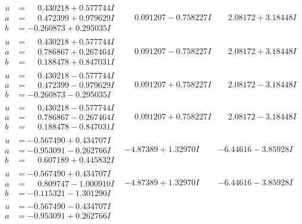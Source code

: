 \documentclass[1p]{elsarticle_modified}
\theoremstyle{definition}
\begin{document}
$$\begin{array}{c|c|c}
\begin{aligned}
u &= \phantom{-}0.430218 + 0.577744 I \\
a &= \phantom{-}0.472399 + 0.979629 I \\
b &= -0.260873 + 0.295035 I\end{aligned}
 & \phantom{-}0.091207 - 0.758227 I & \phantom{-}2.08172 + 3.18448 I \\ \hline\begin{aligned}
u &= \phantom{-}0.430218 + 0.577744 I \\
a &= \phantom{-}0.786867 + 0.267464 I \\
b &= \phantom{-}0.188478 + 0.847031 I\end{aligned}
 & \phantom{-}0.091207 - 0.758227 I & \phantom{-}2.08172 + 3.18448 I \\ \hline\begin{aligned}
u &= \phantom{-}0.430218 - 0.577744 I \\
a &= \phantom{-}0.472399 - 0.979629 I \\
b &= -0.260873 - 0.295035 I\end{aligned}
 & \phantom{-}0.091207 + 0.758227 I & \phantom{-}2.08172 - 3.18448 I \\ \hline\begin{aligned}
u &= \phantom{-}0.430218 - 0.577744 I \\
a &= \phantom{-}0.786867 - 0.267464 I \\
b &= \phantom{-}0.188478 - 0.847031 I\end{aligned}
 & \phantom{-}0.091207 + 0.758227 I & \phantom{-}2.08172 - 3.18448 I \\ \hline\begin{aligned}
u &= -0.567490 + 0.434707 I \\
a &= -0.953091 - 0.262766 I \\
b &= \phantom{-}0.607189 + 0.445832 I\end{aligned}
 & -4.87389 + 1.32970 I & -6.44616 - 3.85928 I \\ \hline\begin{aligned}
u &= -0.567490 + 0.434707 I \\
a &= \phantom{-}0.809747 - 1.000910 I \\
b &= -0.115321 - 1.301290 I\end{aligned}
 & -4.87389 + 1.32970 I & -6.44616 - 3.85928 I \\ \hline\begin{aligned}
u &= -0.567490 - 0.434707 I \\
a &= -0.953091 + 0.262766 I \\

\end{aligned}
\end{array}$$
\end{document}
